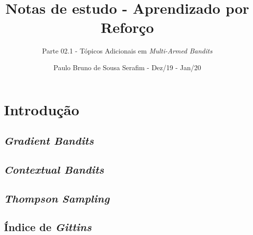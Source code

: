 \documentclass{article}
\title{Notas de estudo - Aprendizado por Reforço}
\author{Parte 02.1 - Tópicos Adicionais em \textit{Multi-Armed Bandits}}
\date{Paulo Bruno de Sousa Serafim - Dez/19 - Jan/20}
\begin{document}
\maketitle

\section{Introdução}

    \subsection{\textit{Gradient Bandits}}
        
    \subsection{\textit{Contextual Bandits}}
    
    \subsection{\textit{Thompson Sampling}}
    
    \subsection{Índice de \textit{Gittins}}
    
\end{document}
